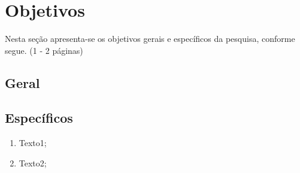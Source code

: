\section{Objetivos}

\label{sec:Objetivos}

Nesta seção apresenta-se  os objetivos gerais e específicos da pesquisa, conforme segue. (1 - 2 páginas) 

\subsection{Geral}

\subsection{Específicos}

\begin{enumerate}

	\item Texto1;
	
	\item Texto2;
	
\end{enumerate}
